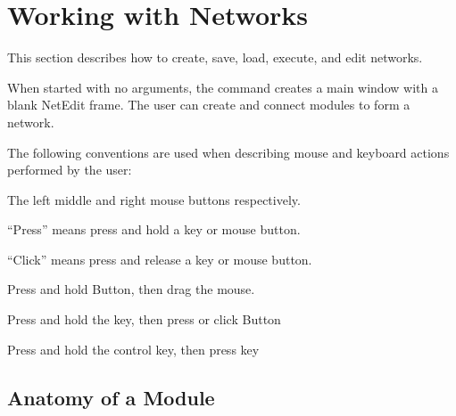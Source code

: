 %
%
%
%
%

\chapter{Working with Networks}
\label{ch:workwithnets}

This section describes how to create, save, load, execute, and edit
networks.

When started with no arguments, the  command creates a
main window with a blank NetEdit frame. The user can create and
connect modules to form a network.

The following conventions are used when describing mouse and keyboard
actions performed by the user:

\begin{description}
 The left middle and right mouse
buttons respectively.

 ``Press'' means press and hold a key or mouse button.

 ``Click'' means press and release a key or mouse button.

 Press and hold Button,
then drag the mouse.

 Press and hold the
 key, then press or click Button

 Press and hold the control key, then
press key 
\end{description}


\section{Anatomy of a Module}
\label{sec:modanatomy}

